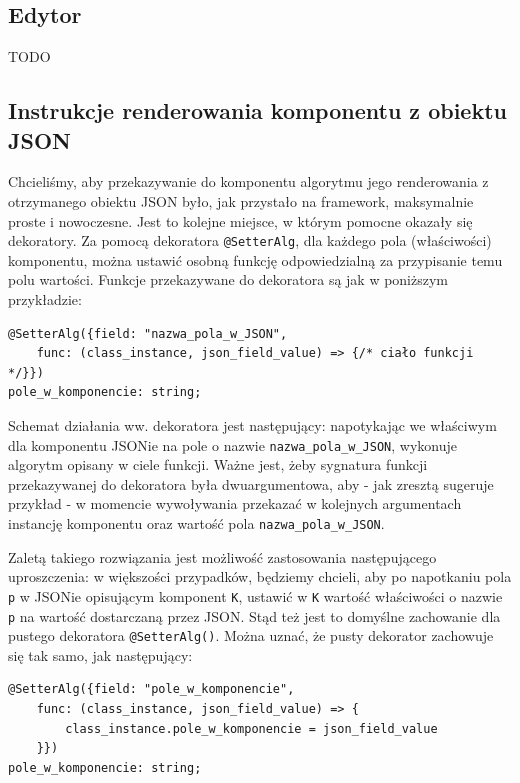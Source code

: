 \documentclass[licencjacka]{pracamgr}
\begin{document}
\subsection{Edytor}
TODO

\subsection{Instrukcje renderowania komponentu z obiektu JSON}
Chcieliśmy, aby przekazywanie do komponentu algorytmu jego renderowania z otrzymanego obiektu JSON było, jak przystało na framework, maksymalnie proste i nowoczesne.
Jest to kolejne miejsce, w którym pomocne okazały się dekoratory. Za pomocą dekoratora \texttt{@SetterAlg}, dla każdego pola (właściwości) komponentu, można ustawić osobną funkcję odpowiedzialną za przypisanie temu polu wartości.
Funkcje przekazywane do dekoratora są jak w poniższym przykładzie:
\begin{verbatim}
@SetterAlg({field: "nazwa_pola_w_JSON", 
    func: (class_instance, json_field_value) => {/* ciało funkcji */}})
pole_w_komponencie: string;
\end{verbatim}

Schemat działania ww. dekoratora jest następujący: napotykając we właściwym dla komponentu JSONie na pole o nazwie
\texttt{nazwa_pola_w_JSON}, wykonuje algorytm opisany w ciele funkcji. Ważne jest, żeby sygnatura funkcji przekazywanej do dekoratora była dwuargumentowa, aby - jak zresztą sugeruje przykład - w momencie wywoływania przekazać w kolejnych argumentach instancję komponentu oraz wartość pola \texttt{nazwa_pola_w_JSON}.

Zaletą takiego rozwiązania jest możliwość zastosowania następującego uproszczenia: w większości przypadków, będziemy chcieli, aby po napotkaniu pola \texttt{p} w JSONie opisującym komponent \texttt{K}, ustawić w \texttt{K} wartość właściwości o nazwie \texttt{p} na wartość dostarczaną przez JSON. Stąd też jest to domyślne zachowanie dla pustego dekoratora
\texttt{@SetterAlg()}. Można uznać, że pusty dekorator zachowuje się tak samo, jak następujący:

\begin{verbatim}
@SetterAlg({field: "pole_w_komponencie", 
    func: (class_instance, json_field_value) => { 
        class_instance.pole_w_komponencie = json_field_value 
    }})
pole_w_komponencie: string;
\end{verbatim}
\end{document}
